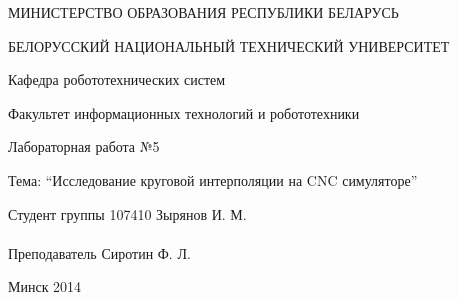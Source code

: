 \begin{titlepage} %

\thispagestyle{empty} %

\begin{center}
МИНИСТЕРСТВО ОБРАЗОВАНИЯ РЕСПУБЛИКИ БЕЛАРУСЬ

БЕЛОРУССКИЙ НАЦИОНАЛЬНЫЙ ТЕХНИЧЕСКИЙ УНИВЕРСИТЕТ

Кафедра робототехнических систем

Факультет информационных технологий и робототехники
\end{center}

\vfill

\begin{center}
Лабораторная работа №5

Тема: ``Исследование круговой интерполяции на CNC симуляторе''
\end{center}

\vfill

\noindent
Студент группы 107410 \hfill Зырянов И. М.
\\
\\
\noindent
Преподаватель \hfill Сиротин Ф. Л.

\vfill

\centerline{Минск 2014}

\clearpage %

\end{titlepage}

\setcounter{page}{2}
